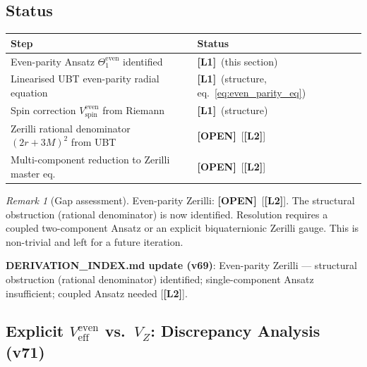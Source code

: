 \documentclass[12pt]{article}
\theoremstyle{definition}
\theoremstyle{remark}
\newtheorem{remark}[theorem]{Remark}
\newcommand{\Lone}{\textbf{[L1]}}
\newcommand{\Ltwo}{\textbf{[L2]}}
\newcommand{\OPEN}{\textbf{[OPEN]}}
\begin{document}
\subsection{Status}

\begin{center}
\begin{tabular}{|l|l|}
\hline
\textbf{Step} & \textbf{Status} \\
\hline
Even-parity Ansatz $\Theta_1^{\text{even}}$ identified & \Lone\ (this section) \\
Linearised UBT even-parity radial equation & \Lone\ (structure, eq.~\eqref{eq:even_parity_eq}) \\
Spin correction $V_{\text{spin}}^{\text{even}}$ from Riemann & \Lone\ (structure) \\
Zerilli rational denominator $(2r+3M)^2$ from UBT & \OPEN\ [\Ltwo] \\
Multi-component reduction to Zerilli master eq. & \OPEN\ [\Ltwo] \\
\hline
\end{tabular}
\end{center}

\begin{remark}[Gap assessment]
Even-parity Zerilli: \OPEN\ [\Ltwo].
The structural obstruction (rational denominator) is now identified.
Resolution requires a coupled two-component Ansatz or an explicit
biquaternionic Zerilli gauge.  This is non-trivial and left for a
future iteration.
\end{remark}

\textbf{DERIVATION\_INDEX.md update (v69)}: Even-parity Zerilli — structural
obstruction (rational denominator) identified; single-component Ansatz
insufficient; coupled Ansatz needed [\Ltwo].

\subsection{Explicit $V_{\text{eff}}^{\text{even}}$ vs.\ $V_Z$: Discrepancy Analysis (v71)}
\label{subsec:zerilli_v71}

\end{document}
